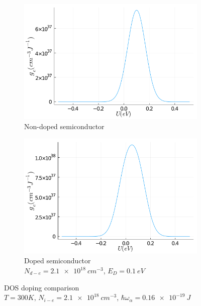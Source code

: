 \begin{figure}[htbp]
    \centering
    \begin{subfigure}[t]{0.49\textwidth}
        \includegraphics[width=\textwidth]{figures/3_elec/dos_undoped.png}
        \caption{Non-doped semiconductor}
    \end{subfigure}
    \begin{subfigure}[t]{0.49\textwidth}
        \includegraphics[width=\textwidth]{figures/3_elec/dos_doped.png}
        \caption{Doped semiconductor \\ $N_{d-e} = \SI{2.1e18}{cm^{-3}}$, $E_D = \SI{0.1}{eV}$}
    \end{subfigure}
    \caption[DOS]{DOS doping comparison \\ $T = 300K$, $N_{i-e} = \SI{2.1e18}{cm^{-3}}$, $\hbar \omega_\alpha = \SI{0.16e-19}{J}$}
    \label{fig:3_2}
\end{figure}

